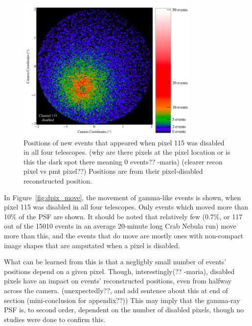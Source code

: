 {    \begin{figure}[!ht]
      \centering
      \includegraphics[width=0.8\textwidth]{images/disabled_pixel/appearing_events}
      \caption[New Events that Appear when Disabling Camera Pixels]{
        Positions of new events that appeared when pixel 115 was disabled in all four telescopes.
        {\color{red}(why are there pixels at the pixel location or is this the dark spot there meaning 0 events?? -maria)}
        {\color{red}(clearer recon pixel vs pmt pixel??)}
        Positions are from their pixel-disabled reconstructed position.
      }
      \label{fig:dpix_appear}
    \end{figure}

    In Figure~\ref{fig:dpix_move}, the movement of gamma-like events is shown, when pixel 115 was disabled in all four telescopes.
    Only events which moved more than 10\% of the PSF are shown.
    It should be noted that relatively few (0.7\%, or 117 out of the 15010 events in an average 20-minute long Crab Nebula run) move more than this, and the events that do move are mostly ones with non-compact image shapes that are amputated when a pixel is disabled.

    What can be learned from this is that a negligbly small number of events' positions depend on a given pixel.
    Though, interestingly{\color{red}(?? -maria)}, disabled pixels have an impact on events' reconstructed positions, even from halfway across the camera.
    {\color{red}(unexpectedly??, and add sentence about this at end of section (mini-conclusion for appendix??))}
    This may imply that the gamma-ray PSF is, to second order, dependent on the number of disabled pixels, though no studies were done to confirm this.

}
